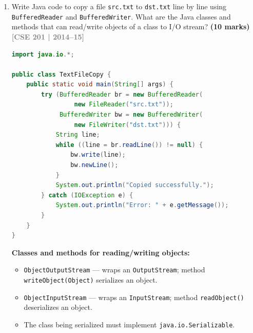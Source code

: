 \documentclass[12pt,a3paper]{article}
\newcommand{\yr}[1]{\hfill\textcolor{gray}{\small\textbf{[#1]}}}
\newcommand{\mk}[1]{\textcolor{orange!70!black}{\small\textbf{(#1 marks)}}}
\begin{document}
\begin{enumerate}
\begin{tcolorbox}
\begin{lstlisting}[language=Java]
// Replaces the manual Clone() method inside the Bullet class
@Override
public Object clone() {
    try {
        // Native JVM bitwise copy; safely accesses all fields regardless of private modifiers
        return super.clone(); 
    } catch (CloneNotSupportedException e) {
        // This will never be reached as Bullet implements Cloneable
        throw new AssertionError("Cloning failed"); 
    }
}
\end{lstlisting}

\end{tcolorbox}

\item Write Java code to copy a file \texttt{src.txt} to \texttt{dst.txt} line by line using \texttt{BufferedReader} and \texttt{BufferedWriter}. What are the Java classes and methods that can read/write objects of a class to I/O stream? \mk{10}
\yr{CSE 201 | 2014--15}

\begin{tcolorbox}[enhanced,breakable,ansbox,
  colback=cA!4,colframe=cA,boxrule=0.8pt,arc=5pt,
  title={\textbf{Answer --- Copy Text File and Object Stream Classes}},
  fonttitle=\bfseries\color{white},colbacktitle=cA]
\begin{lstlisting}[language=Java]
import java.io.*;

public class TextFileCopy {
    public static void main(String[] args) {
        try (BufferedReader br = new BufferedReader(
                 new FileReader("src.txt"));
             BufferedWriter bw = new BufferedWriter(
                 new FileWriter("dst.txt"))) {
            String line;
            while ((line = br.readLine()) != null) {
                bw.write(line);
                bw.newLine();
            }
            System.out.println("Copied successfully.");
        } catch (IOException e) {
            System.out.println("Error: " + e.getMessage());
        }
    }
}
\end{lstlisting}

\textbf{Classes and methods for reading/writing objects:}
\begin{itemize}[itemsep=2pt]
  \item \texttt{ObjectOutputStream} --- wraps an \texttt{OutputStream};
  method \texttt{writeObject(Object)} serializes an object.
  \item \texttt{ObjectInputStream} --- wraps an \texttt{InputStream};
  method \texttt{readObject()} deserializes an object.
  \item The class being serialized must implement
  \texttt{java.io.Serializable}.
\end{itemize}
\end{tcolorbox}


\end{enumerate}
\end{document}
